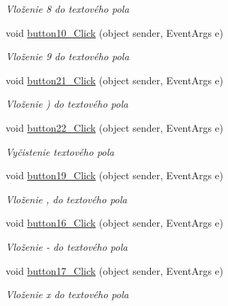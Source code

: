 \begin{DoxyCompactItemize}
\begin{DoxyCompactList}\small\item\em Vloženie \textquotesingle{}8\textquotesingle{} do textového pola \end{DoxyCompactList}\item 
void \mbox{\hyperlink{class_i_v_s_1_1_calculator_aa06324ed88e9004bf9cd91dd9195e146}{button10\+\_\+\+Click}} (object sender, Event\+Args e)
\begin{DoxyCompactList}\small\item\em Vloženie \textquotesingle{}9\textquotesingle{} do textového pola \end{DoxyCompactList}\item 
void \mbox{\hyperlink{class_i_v_s_1_1_calculator_a33dc653a738421ce3fe770c4c470a224}{button21\+\_\+\+Click}} (object sender, Event\+Args e)
\begin{DoxyCompactList}\small\item\em Vloženie \textquotesingle{})\textquotesingle{} do textového pola \end{DoxyCompactList}\item 
void \mbox{\hyperlink{class_i_v_s_1_1_calculator_aabdaceb3733e6b9873224d39ba10aec0}{button22\+\_\+\+Click}} (object sender, Event\+Args e)
\begin{DoxyCompactList}\small\item\em Vyčistenie textového pola \end{DoxyCompactList}\item 
void \mbox{\hyperlink{class_i_v_s_1_1_calculator_a2ec5538328f39267ddd848fbc9200de7}{button19\+\_\+\+Click}} (object sender, Event\+Args e)
\begin{DoxyCompactList}\small\item\em Vloženie \textquotesingle{},\textquotesingle{} do textového pola \end{DoxyCompactList}\item 
void \mbox{\hyperlink{class_i_v_s_1_1_calculator_a8e6a0c70145a0d3bfe53de19b9e980ea}{button16\+\_\+\+Click}} (object sender, Event\+Args e)
\begin{DoxyCompactList}\small\item\em Vloženie \textquotesingle{}-\/\textquotesingle{} do textového pola \end{DoxyCompactList}\item 
void \mbox{\hyperlink{class_i_v_s_1_1_calculator_a4aeaedb8a5683241723ba2c8a7046912}{button17\+\_\+\+Click}} (object sender, Event\+Args e)
\begin{DoxyCompactList}\small\item\em Vloženie \textquotesingle{}x\textquotesingle{} do textového pola \end{DoxyCompactList}\item 

\end{DoxyCompactItemize}
